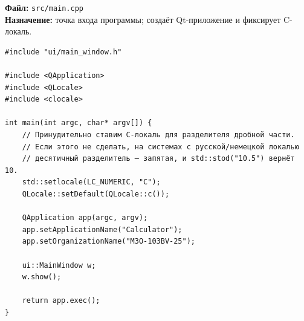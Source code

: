 



\noindent\textbf{Файл:} \texttt{src/main.cpp}\\
\textbf{Назначение:} точка входа программы; создаёт Qt-приложение и фиксирует C-локаль.

\begin{lstlisting}
#include "ui/main_window.h"

#include <QApplication>
#include <QLocale>
#include <clocale>

int main(int argc, char* argv[]) {
    // Принудительно ставим C-локаль для разделителя дробной части.
    // Если этого не сделать, на системах с русской/немецкой локалью
    // десятичный разделитель — запятая, и std::stod("10.5") вернёт 10.
    std::setlocale(LC_NUMERIC, "C");
    QLocale::setDefault(QLocale::c());

    QApplication app(argc, argv);
    app.setApplicationName("Calculator");
    app.setOrganizationName("M3O-103BV-25");

    ui::MainWindow w;
    w.show();

    return app.exec();
}
\end{lstlisting}


